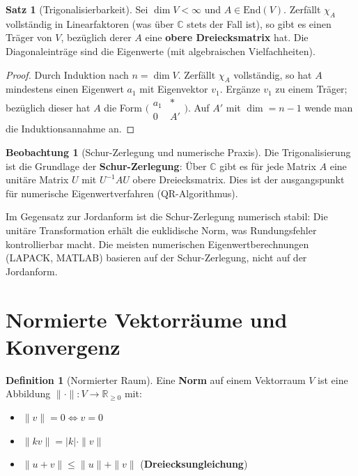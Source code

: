 ﻿\documentclass[a4paper,12pt]{report}
\theoremstyle{definition}
\newtheorem{definition}{Definition}
\newtheorem{satz}{Satz}
\newtheorem{beobachtung}{Beobachtung}
\begin{document}
\begin{satz}[Trigonalisierbarkeit]
    Sei $\dim V < \infty$ und $A \in \mathrm{End}(V)$. Zerfällt $\chi_A$
    vollständig in Linearfaktoren (was über $\mathbb{C}$ stets der Fall ist),
    so gibt es einen Träger von $V$, bezüglich derer $A$ eine
    \textbf{obere Dreiecksmatrix} hat. Die Diagonaleinträge sind die Eigenwerte
    (mit algebraischen Vielfachheiten).
\end{satz}
\begin{proof}
    Durch Induktion nach $n = \dim V$. Zerfällt $\chi_A$ vollständig,
    so hat $A$ mindestens einen Eigenwert $a_1$ mit Eigenvektor $v_1$.
    Ergänze $v_1$ zu einem Träger; bezüglich dieser hat $A$ die Form
    $\bigl(\begin{smallmatrix} a_1 & * \\ 0 & A' \end{smallmatrix}\bigr)$.
    Auf $A'$ mit $\dim = n-1$ wende man die Induktionsannahme an.
\end{proof}

\begin{beobachtung}[Schur-Zerlegung und numerische Praxis]
    Die Trigonalisierung ist die Grundlage der \textbf{Schur-Zerlegung}:
    Über $\mathbb{C}$ gibt es für jede Matrix $A$ eine unitäre Matrix $U$
    mit $U^{-1}AU$ obere Dreiecksmatrix. Dies ist der
    ausgangspunkt für numerische Eigenwertverfahren (QR-Algorithmus).

    Im Gegensatz zur Jordanform ist die Schur-Zerlegung numerisch stabil:
    Die unitäre Transformation erhält die euklidische Norm, was
    Rundungsfehler kontrollierbar macht. Die meisten numerischen
    Eigenwertberechnungen (LAPACK, MATLAB) basieren auf der Schur-Zerlegung,
    nicht auf der Jordanform.
\end{beobachtung}

\section{Normierte Vektorräume und Konvergenz}

\begin{definition}[Normierter Raum]
    Eine \textbf{Norm} auf einem Vektorraum $V$ ist eine Abbildung
    $\|\cdot\| : V \to \mathbb{R}_{\ge 0}$ mit:
    \begin{itemize}
        \item[-] $\|v\| = 0 \Leftrightarrow v = 0$
        \item[-] $\|kv\| = |k| \cdot \|v\|$
        \item[-] $\|u + v\| \le \|u\| + \|v\|$ \quad (\textbf{Dreiecksungleichung})
    \end{itemize}
\end{definition}
\end{document}
